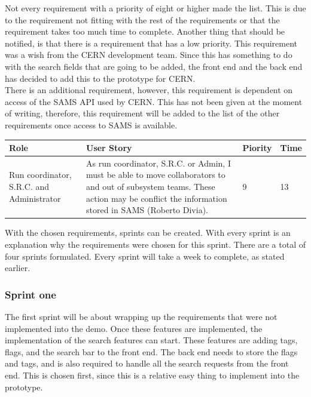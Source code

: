 \documentclass[paper=a4, fontsize=11pt,twoside]{scrartcl}	%
\begin{document}
Not every requirement with a priority of eight or higher made the list. This is due to the requirement not fitting with the rest of the requirements or that the requirement takes too much time to complete. Another thing that should be notified, is that there is a requirement that has a low priority. This requirement was a wish from the CERN development team. Since this has something to do with the search fields that are going to be added, the front end and the back end has decided to add this to the prototype for CERN.   \\

There is an additional requirement, however, this requirement is dependent on access of the SAMS API used by CERN. This has not been given at the moment of writing, therefore, this requirement will be added to the list of the other requirements once access to SAMS is available. \\

\begin{longtable}{ | p{3cm} | p{8cm} | p{1cm} | l |}
\hline
Role & User Story & Piority & Time \\ \hline
Run coordinator, S.R.C. and Administrator &  As run coordinator, S.R.C. or Admin, I must be able to move collaborators to and out of subsystem teams. These action may be conflict the information stored in SAMS (Roberto Divia). & 9 & 13 \\ \hline
\end{longtable}

With the chosen requirements, sprints can be created. With every sprint is an explanation why the requirements were chosen for this sprint. There are a total of four sprints formulated. Every sprint will take a week to complete, as stated earlier.

\subsubsection{Sprint one}
The first sprint will be about wrapping up the requirements that were not implemented into the demo. Once these features are implemented, the implementation of the search features can start. These features are adding tags, flags, and the search bar to the front end. The back end needs to store the flags and tags, and is also required to handle all the search requests from the front end. This is chosen first, since this is a relative easy thing to implement into the prototype.
\end{document}

